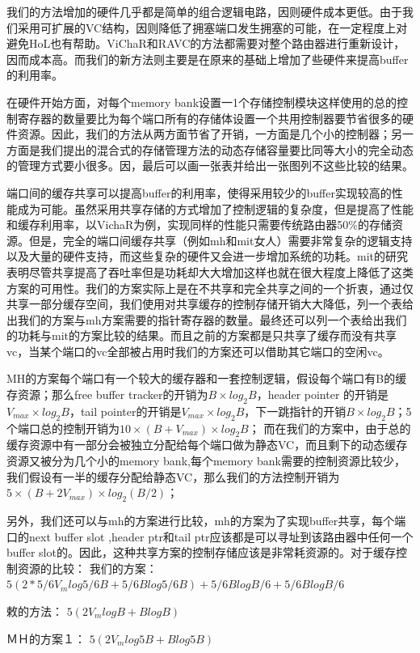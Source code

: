﻿\documentclass[10pt,journal]{IEEEtran}
\begin{document}
我们的方法增加的硬件几乎都是简单的组合逻辑电路，因则硬件成本更低。由于我们采用可扩展的VC结构，因则降低了拥塞端口发生拥塞的可能，在一定程度上对避免HoL也有帮助。ViChaR和RAVC的方法都需要对整个路由器进行重新设计，因而成本高。而我们的新方法则主要是在原来的基础上增加了些硬件来提高buffer的利用率。

在硬件开始方面，对每个memory bank设置一1个存储控制模块这样使用的总的控制寄存器的数量要比为每个端口所有的存储体设置一个共用控制器要节省很多的硬件资源。因此，我们的方法从两方面节省了开销，一方面是几个小的控制器；另一方面是我们提出的混合式的存储管理方法的动态存储容量要比同等大小的完全动态的管理方式要小很多。因，最后可以画一张表并给出一张图列不这些比较的结果。

端口间的缓存共享可以提高buffer的利用率，使得采用较少的buffer实现较高的性能成为可能。虽然采用共享存储的方式增加了控制逻辑的复杂度，但是提高了性能和缓存利用率，以VichaR为例，实现同样的性能只需要传统路由器50\%的存储资源。但是，完全的端口间缓存共享（例如mh和mit女人）需要非常复杂的逻辑支持以及大量的硬件支持，而这些复杂的硬件又会进一步增加系统的功耗。mit的研究表明尽管共享提高了吞吐率但是功耗却大大增加这样也就在很大程度上降低了这类方案的可用性。我们的方案实际上是在不共享和完全共享之间的一个折衷，通过仅共享一部分缓存空间，我们使用对共享缓存的控制存储开销大大降低，列一个表给出我们的方案与mh方案需要的指针寄存器的数量。最终还可以列一个表给出我们的功耗与mit的方案比较的结果。而且之前的方案都是只共享了缓存而没有共享vc，当某个端口的vc全部被占用时我们的方案还可以借助其它端口的空闲vc。

MH的方案每个端口有一个较大的缓存器和一套控制逻辑，假设每个端口有B的缓存资源；那么free buffer tracker的开销为$B\times log_2 B$，header pointer 
的开销是$V_{max}\times log_2 B$，tail pointer的开销是$V_{max}\times log_2 B$，下一跳指针的开销$B\times log_2 B$；5个端口总的控制开销为$10\times(B+V_{max})\times log_2B$；
而在我们的方案中，由于总的缓存资源中有一部分会被独立分配给每个端口做为静态VC，而且剩下的动态缓存资源又被分为几个小的memory bank,每个memory bank需要的控制资源比较少，我们假设有一半的缓存分配给静态VC，那么我们的方法控制开销为$5\times(B+2V_{max})\times log_2(B/2)$；

另外，我们还可以与mh的方案进行比较，mh的方案为了实现buffer共享，每个端口的next buffer slot ,header ptr和tail ptr应该都是可以寻址到该路由器中任何一个buffer slot的。因此，这种共享方案的控制存储应该是非常耗资源的。对于缓存控制资源的比较：
我们的方案：
$5(2*5/6V_mlog5/6B+5/6Blog5/6B)+5/6BlogB/6+5/6BlogB/6$

敕的方法：
$5(2V_mlogB+BlogB)$

ＭＨ的方案１： 
$5(2V_mlog5B+Blog5B)$
\end{document}

